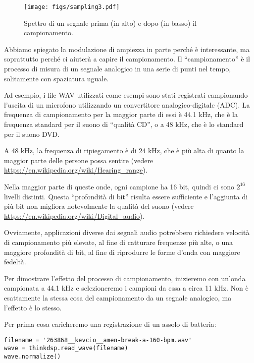 \documentclass[12pt,a4paper]{book}
\begin{document}
\begin{figure} 

\centerline{\texttt{[image: figs/sampling3.pdf]}} \caption{Spettro di un segnale prima (in alto) e dopo (in basso) il campionamento.} \label{fig.sampling3} \end{figure} 

Abbiamo spiegato la modulazione di ampiezza in parte perché è interessante, ma soprattutto perché ci aiuterà a capire il campionamento. Il ``campionamento'' è il processo di misura di un segnale analogico in una serie di punti nel tempo, solitamente con spaziatura uguale.

Ad esempio, i file WAV utilizzati come esempi sono stati registrati campionando l'uscita di un microfono utilizzando un convertitore analogico-digitale (ADC). La frequenza di campionamento per la maggior parte di essi è 44.1 kHz, che è la frequenza standard per il suono di ``qualità CD'', o a 48 kHz, che è lo standard per il suono DVD.

A 48 kHz, la frequenza di ripiegamento è di 24 kHz, che è più alta di quanto la maggior parte delle persone possa sentire (vedere \url{https://en.wikipedia.org/wiki/Hearing_range}).

Nella maggior parte di queste onde, ogni campione ha 16 bit, quindi ci sono $2^{16}$ livelli distinti. Questa ``profondità di bit'' risulta essere sufficiente e l'aggiunta di più bit non migliora notevolmente la qualità del suono (vedere \url{https://en.wikipedia.org/wiki/Digital_audio}).

Ovviamente, applicazioni diverse dai segnali audio potrebbero richiedere velocità di campionamento più elevate, al fine di catturare frequenze più alte, o una maggiore profondità di bit, al fine di riprodurre le forme d'onda con maggiore fedeltà.

Per dimostrare l'effetto del processo di campionamento, inizieremo con un'onda campionata a 44.1 kHz e selezioneremo i campioni da essa a circa 11 kHz. Non è esattamente la stessa cosa del campionamento da un segnale analogico, ma l'effetto è lo stesso.

Per prima cosa caricheremo una registrazione di un assolo di batteria:

\begin{verbatim} 
filename = '263868__kevcio__amen-break-a-160-bpm.wav'
wave = thinkdsp.read_wave(filename)
wave.normalize()
 \end{verbatim} 
\end{document}
